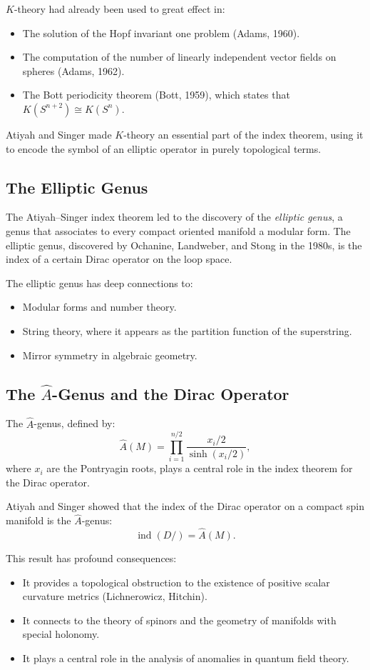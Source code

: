 $K$-theory had already been used to great effect in:
\begin{itemize}
\item The solution of the Hopf invariant one problem (Adams, 1960).
\item The computation of the number of linearly independent vector fields on spheres (Adams, 1962).
\item The Bott periodicity theorem (Bott, 1959), which states that $K(S^{n+2}) \cong K(S^n)$.
\end{itemize}

Atiyah and Singer made $K$-theory an essential part of the index theorem, using it to encode the symbol of an elliptic operator in purely topological terms.

\subsection{The Elliptic Genus}

The Atiyah--Singer index theorem led to the discovery of the \emph{elliptic genus}, a genus that associates to every compact oriented manifold a modular form. The elliptic genus, discovered by Ochanine, Landweber, and Stong in the 1980s, is the index of a certain Dirac operator on the loop space.

The elliptic genus has deep connections to:
\begin{itemize}
\item Modular forms and number theory.
\item String theory, where it appears as the partition function of the superstring.
\item Mirror symmetry in algebraic geometry.
\end{itemize}

\subsection{The $\widehat A$-Genus and the Dirac Operator}

The $\widehat A$-genus, defined by:
\[
\widehat A(M) = \prod_{i=1}^{n/2} \frac{x_i/2}{\sinh(x_i/2)},
\]
where $x_i$ are the Pontryagin roots, plays a central role in the index theorem for the Dirac operator.

Atiyah and Singer showed that the index of the Dirac operator on a compact spin manifold is the $\widehat A$-genus:
\[
\operatorname{ind}(D\!\!\!\!/) = \widehat A(M).
\]

This result has profound consequences:
\begin{itemize}
\item It provides a topological obstruction to the existence of positive scalar curvature metrics (Lichnerowicz, Hitchin).
\item It connects to the theory of spinors and the geometry of manifolds with special holonomy.
\item It plays a central role in the analysis of anomalies in quantum field theory.
\end{itemize}

